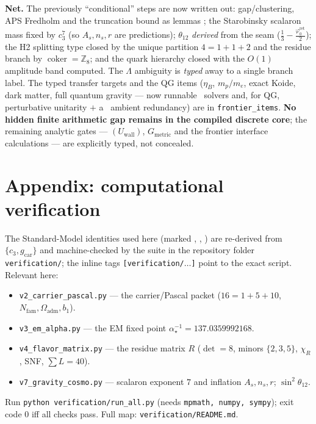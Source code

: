 \documentclass[11pt,a4paper]{article}
\newcommand{\gcar}{g_{\mathrm{car}}}
\newcommand{\Nfam}{N_{\mathrm{fam}}}
\newcommand{\Oadm}{\Omega_{\mathrm{adm}}}
\newcommand{\cthree}{c_3}
\newcommand{\phiz}{\varphi_0^{\mathrm{ret}}}
\newcommand{\ainv}{\alpha^{-1}_\star}
\newcommand{\Z}{\mathbb{Z}}
\theoremstyle{definition}
\begin{document}
\noindent\textbf{Net.} The previously ``conditional'' steps are now written out: gap/clustering, APS
Fredholm and the truncation bound as lemmas \mE; the Starobinsky scalaron mass fixed by $\cthree^7$ (so
$A_s,n_s,r$ are predictions); $\theta_{12}$ \emph{derived} from the seam ($\tfrac13-\tfrac{\phiz}{2}$);
the H2 splitting type closed by the unique partition $4{=}1{+}1{+}2$ and the residue branch by
$\operatorname{coker}=\Z_8$; and the quark hierarchy closed with the $O(1)$ amplitude band computed. The
$\Lambda$ ambiguity is \emph{typed} away to a single branch label. The typed transfer targets and the QG items
($\eta_B$, $m_p/m_e$, exact Koide, dark matter, full quantum gravity --- now runnable \mC\ solvers and, for QG,
perturbative unitarity $+$ a \mC\ ambient redundancy) are in \texttt{frontier\_items}.
\textbf{No hidden finite arithmetic gap remains in the compiled discrete core}; the remaining analytic gates
--- $(U_{\mathrm{wall}})$, $G_{\mathrm{metric}}$ and the frontier interface calculations --- are explicitly
typed, not concealed.

\section*{Appendix: computational verification}
The Standard-Model identities used here (marked \mE, \mE, \mE) are re-derived from $\{\cthree,\gcar\}$ and
machine-checked by the suite in the repository folder \texttt{verification/}; the inline tags
\texttt{[verification/$\dots$]} point to the exact script. Relevant here:
\begin{itemize}[leftmargin=1.4em,itemsep=1pt]
\item \texttt{v2\_carrier\_pascal.py} --- the carrier/Pascal packet ($16{=}1{+}5{+}10$, $\Nfam,\Oadm,b_1$).
\item \texttt{v3\_em\_alpha.py} --- the EM fixed point $\ainv{=}137.0359992168$.
\item \texttt{v4\_flavor\_matrix.py} --- the residue matrix $R$ ($\det{=}8$, minors $\{2,3,5\}$, $\chi_R$, SNF, $\sum L{=}40$).
\item \texttt{v7\_gravity\_cosmo.py} --- scalaron exponent $7$ and inflation $A_s,n_s,r$; $\sin^2\theta_{12}$.
\end{itemize}
Run \texttt{python verification/run\_all.py} (needs \texttt{mpmath, numpy, sympy}); exit code $0$ iff all
checks pass. Full map: \texttt{verification/README.md}.


\end{document}
